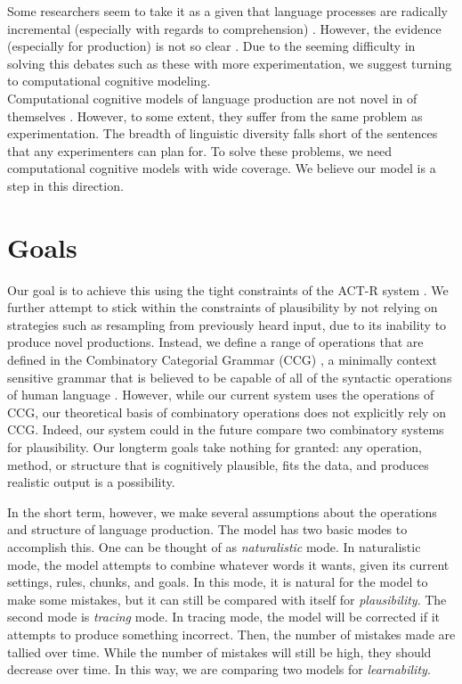  \indent Some researchers seem to take it as a given that language processes are radically incremental (especially with regards to comprehension) \citep{tag1}\citep{radical}. However, the evidence (especially for production) is not so clear \citep{incremental}. Due to the seeming difficulty in solving this debates such as these with more experimentation, we suggest turning to computational cognitive modeling.\\
 \indent Computational cognitive models of language production are not novel in of themselves \citep{model}. However, to some extent, they suffer from the same problem as experimentation. The breadth of linguistic diversity falls short of the sentences that any experimenters can plan for. To solve these problems, we need computational cognitive models with wide coverage. We believe our model is a step in this direction.
 
\section{Goals}
Our goal is to achieve this using the tight constraints of the ACT-R system \citep{actr}. We further attempt to stick within the constraints of plausibility by not relying on strategies such as resampling from previously heard input, due to its inability to produce novel productions. Instead, we define a range of operations that are defined in the Combinatory Categorial Grammar (CCG) \citep{ccg}, a minimally context sensitive grammar that is believed to be capable of all of the syntactic operations of human language \citep{convergence}. However, while our current system uses the operations of CCG, our theoretical basis of combinatory operations does not explicitly rely on CCG. Indeed, our system could in the future compare two combinatory systems for plausibility. Our longterm goals take nothing for granted: any operation, method, or structure that is cognitively plausible, fits the data, and produces realistic output is a possibility. 

In the short term, however, we make several assumptions about the operations and structure of language production. The model has two basic modes to accomplish this. One can be thought of as \textit{naturalistic} mode. In naturalistic mode, the model attempts to combine whatever words it wants, given its current settings, rules, chunks, and goals. In this mode, it is natural for the model to make some mistakes, but it can still be compared with itself for \textit{plausibility}. The second mode is \textit{tracing} mode. In tracing mode, the model will be corrected if it attempts to produce something incorrect. Then, the number of mistakes made are tallied over time. While the number of mistakes will still be high, they should decrease over time. In this way, we are comparing two models for \textit{learnability}. 


